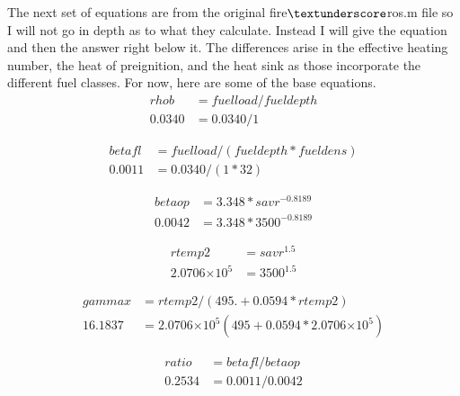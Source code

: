 \documentclass{article}
\newcommand\tenpow[1]{\ensuremath{{\times}10^{#1}}}
\newcommand\und{\textunderscore}
\begin{document}
The next set of equations are from the original fire$\und$ros.m file so I will not go in depth as to what they calculate. Instead I will give the equation and then the answer right below it. The differences arise in the effective heating number, the heat of preignition, and the heat sink as those incorporate the different fuel classes. For now, here are some of the base equations.
\begin{equation}
\label{rhob_WFA}
	\begin{split}
		rhob  &= fuelload/fueldepth \\
		0.0340 &= 0.0340 / 1
	\end{split}
\end{equation}


\begin{equation}
	\label{betafl_WFA}
	\begin{split}
		betafl        &= fuelload/(fueldepth * fueldens) \\
		0.0011 &= 0.0340 / (1 * 32)
	\end{split}
\end{equation}



\begin{equation}
\label{betaop_WFA}
	\begin{split}
		betaop        &= 3.348 * savr^{ -0.8189} \\
		0.0042 &= 3.348 * 3500 ^ { -0.8189}
	\end{split}
\end{equation}


\begin{equation}
	\label{rtemp2_WFA}
	\begin{split}
		rtemp2        &= savr^ {1.5} \\
		2.0706\tenpow{5} &= 3500 ^ {1.5}
	\end{split}
\end{equation}


\begin{equation}
	\label{gammax_WFA}
	\begin{split}
		gammax        &= rtemp2/(495. + 0.0594*rtemp2) \\
		16.1837 &= 2.0706\tenpow{5} (495 + 0.0594* 2.0706\tenpow{5})
	\end{split}
\end{equation}

\begin{equation}
	\label{ratio_WFA}
	\begin{split}
		ratio &= betafl/betaop \\ 
		0.2534 &=0.0011 / 0.0042
	\end{split}
\end{equation}
\end{document}

